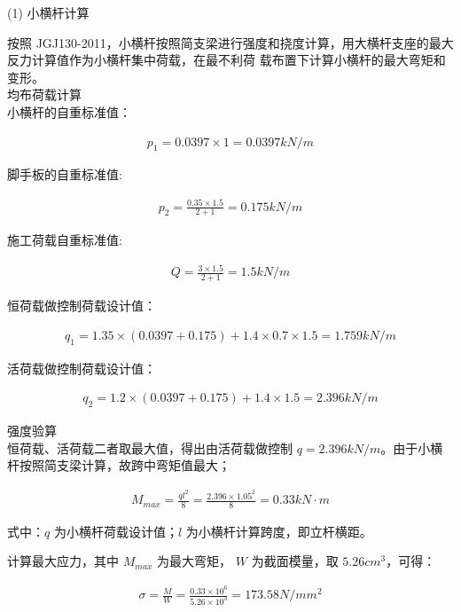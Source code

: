 (1) 小横杆计算

按照 JGJ130-2011，小横杆按照简支梁进行强度和挠度计算，用大横杆支座的最大反力计算值作为小横杆集中荷载，在最不利荷
载布置下计算小横杆的最大弯矩和变形。\\

 均布荷载计算\\

小横杆的自重标准值：

\begin{align}
    p_1=0.0397 \times 1=0.0397 kN/m
\end{align}

脚手板的自重标准值:

\begin{align}
    p_2=\frac{0.35 \times 1.5}{2+1}=0.175 kN/m
\end{align}

施工荷载自重标准值:

\begin{align}
    Q=\frac{3 \times 1.5}{2+1}=1.5 kN/m
\end{align}

恒荷载做控制荷载设计值：

\begin{align}
    q_1=1.35\times(0.0397+0.175)+1.4\times 0.7\times 1.5=1.759 kN/m
\end{align}

活荷载做控制荷载设计值：

\begin{align}
    q_2=1.2\times(0.0397+0.175)+1.4\times 1.5=2.396 kN/m
\end{align}

 强度验算\\

恒荷载、活荷载二者取最大值，得出由活荷载做控制 $q=2.396 kN/m$。由于小横杆按照简支梁计算，故跨中弯矩值最大；

\begin{align}
    M_{max}=\frac{ql^2}{8}=\frac{2.396\times 1.05^2}{8}=0.33 kN\cdot m
\end{align}

式中：$q$ 为小横杆荷载设计值；$l$ 为小横杆计算跨度，即立杆横距。

计算最大应力，其中 $M_{max}$ 为最大弯矩， $W$ 为截面模量，取 $5.26 cm^3$，可得：

\begin{align}
    \label{fx:load}
    \sigma =\frac{M}{W}=\frac{0.33\times 10^6}{5.26\times10^3}=173.58N/mm^2
\end{align}

